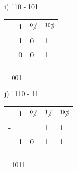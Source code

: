\begin{figure}[H]
    \begin{minipage}[t]{0.45\textwidth}
        i) 110 - 101
        \begin{table}[H]
            \centering
            \begin{tabularx}{0.5\linewidth}{rXXX}
                & 1 & $^0\cancel{1}$ & $^{10}\cancel{0}$ \\
                - & 1 & 0 & 1\\
                \cline{2-4}
                & 0 & 0 & 1 \\
                \cline{2-4}
                &  & & 
            \end{tabularx}
        \end{table}
        = 001
    \end{minipage}\hfill
    \begin{minipage}[t]{0.45\textwidth}
        j) 1110 - 11
        \begin{table}[H]
            \centering
            \begin{tabularx}{0.6\linewidth}{rXXXX}
                & 1 & $^0\cancel{1}$ & $^{1}\cancel{1}$ & $^{10}\cancel{0}$ \\
                - &  &  & 1 & 1 \\
                \cline{2-5}
                & 1 & 0 & 1 & 1 \\
                \cline{2-5}
                &  & &  & 
            \end{tabularx}
        \end{table}
        = 1011
    \end{minipage}\hfill
\end{figure}

